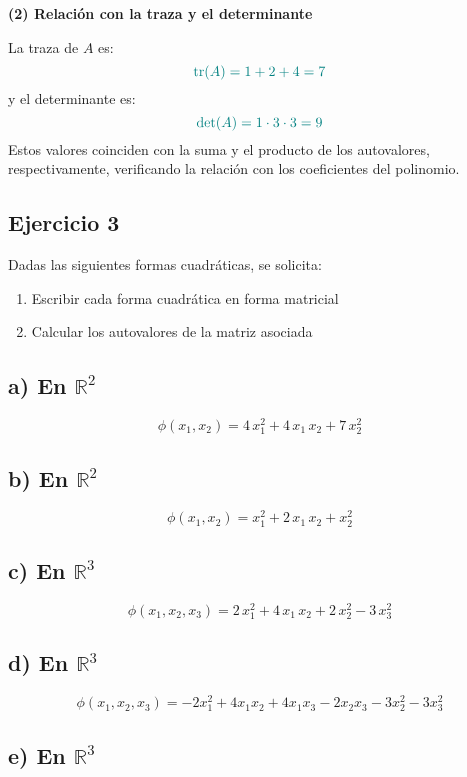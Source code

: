\documentclass{article}
\begin{document}
\bigskip

\textbf{(2) Relación con la traza y el determinante}

La traza de \(A\) es:
\[
\color{teal}
\text{tr}(A) = 1 + 2 + 4 = 7
\]
y el determinante es:
\[
\color{teal}
\det(A) = 1\cdot3\cdot3 = 9
\]
Estos valores coinciden con la suma y el producto de los autovalores, respectivamente, verificando la relación con los coeficientes del polinomio.

\newpage
\subsection{Ejercicio 3}


Dadas las siguientes formas cuadráticas, se solicita:
\begin{enumerate}
  \item Escribir cada forma cuadrática en forma matricial
  \item Calcular los autovalores de la matriz asociada
\end{enumerate}

\subsection*{a) En \(\mathbb{R}^2\)}

\[
\phi(x_1,x_2) = 4\,x_1^2 + 4\,x_1\,x_2 + 7\,x_2^2
\]

\subsection*{b) En \(\mathbb{R}^2\)}

\[
\phi(x_1,x_2) = x_1^2 + 2\,x_1\,x_2 + x_2^2
\]

\subsection*{c) En \(\mathbb{R}^3\)}

\[
\phi(x_1,x_2,x_3) = 2\,x_1^2 + 4\,x_1\,x_2 + 2\,x_2^2 - 3\,x_3^2
\]



\subsection*{d) En \(\mathbb{R}^3\)}

\[
\phi(x_1,x_2,x_3) = -2x_1^2 + 4x_1x_2 + 4x_1x_3 - 2x_2x_3 - 3x_2^2 - 3x_3^2
\]
\subsection*{e) En \(\mathbb{R}^3\)}
\end{document}
